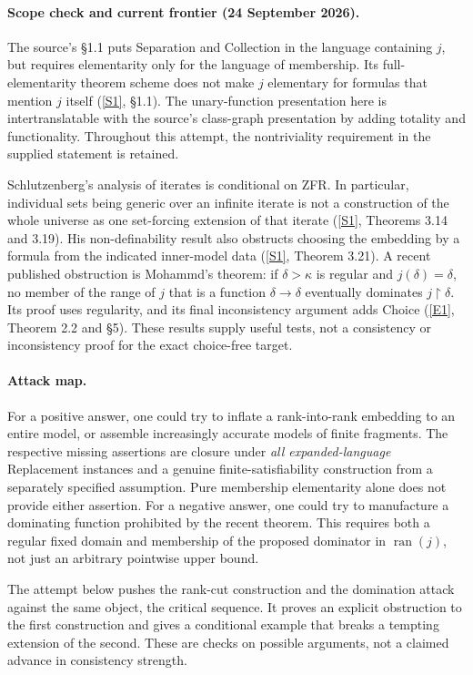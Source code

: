 \documentclass[11pt]{article}
\newcommand{\sref}[2]{\hyperlink{source:#1:#2}{[S#2]}}
\newcommand{\eref}[2]{\hyperlink{extra:#1:#2}{[E#2]}}
\begin{document}
\paragraph{Scope check and current frontier (24 September 2026).}
The source's \S1.1 puts Separation and Collection in the language containing
$j$, but requires elementarity only for the language of membership.  Its
full-elementarity theorem scheme does not make $j$ elementary for formulas
that mention $j$ itself (\sref{152}{1}, \S1.1).  The unary-function presentation
here is intertranslatable with the source's class-graph presentation by adding
totality and functionality.  Throughout this attempt, the nontriviality
requirement in the supplied statement is retained.

Schlutzenberg's analysis of iterates is conditional on ZFR.  In particular,
individual sets being generic over an infinite iterate is not a construction
of the whole universe as one set-forcing extension of that iterate
(\sref{152}{1}, Theorems 3.14 and 3.19).  His non-definability result also
obstructs choosing the embedding by a formula from the indicated inner-model
data (\sref{152}{1}, Theorem 3.21).
A recent published obstruction is Mohammd's theorem: if $\delta>\kappa$
is regular and $j(\delta)=\delta$, no member of the range of $j$ that is a
function $\delta\to\delta$ eventually dominates $j\!\upharpoonright\!\delta$.
Its proof uses regularity, and its final inconsistency argument adds Choice
(\eref{152}{1}, Theorem 2.2 and \S5).  These results supply useful tests, not a
consistency or inconsistency proof for the exact choice-free target.

\paragraph{Attack map.}
For a positive answer, one could try to inflate a rank-into-rank embedding to
an entire model, or assemble increasingly accurate models of finite fragments.
The respective missing assertions are closure under \emph{all expanded-language}
Replacement instances and a genuine finite-satisfiability construction from a
separately specified assumption.  Pure membership elementarity alone does not
provide either assertion.  For a negative answer, one could try to manufacture
a dominating function prohibited by the recent theorem.  This requires both a
regular fixed domain and membership of the proposed dominator in
$\operatorname{ran}(j)$, not just an arbitrary pointwise upper bound.

The attempt below pushes the rank-cut construction and the domination attack
against the same object, the critical sequence.  It proves an explicit
obstruction to the first construction and gives a conditional example that
breaks a tempting extension of the second.  These are checks on possible
arguments, not a claimed advance in consistency strength.
\end{document}
